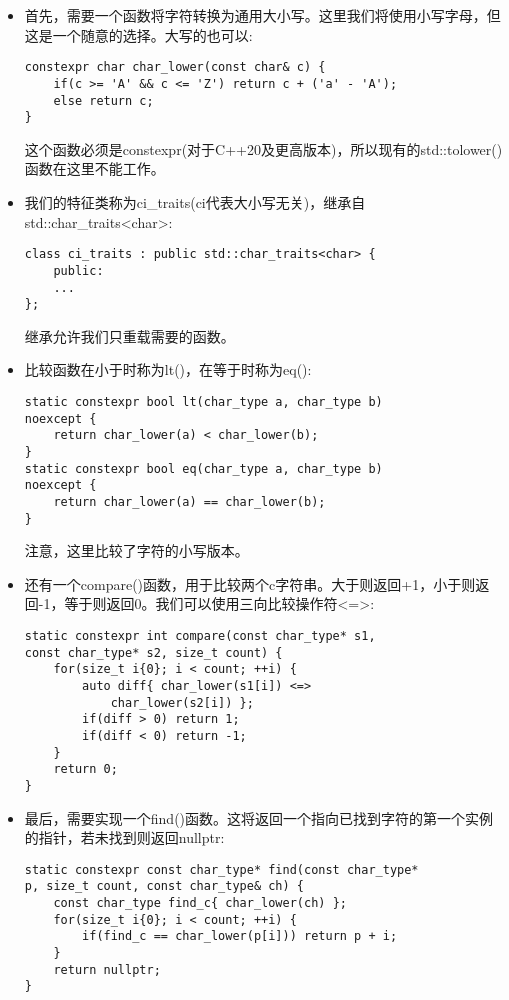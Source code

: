 \begin{itemize}
\item 
首先，需要一个函数将字符转换为通用大小写。这里我们将使用小写字母，但这是一个随意的选择。大写的也可以:

\begin{lstlisting}[style=styleCXX]
constexpr char char_lower(const char& c) {
	if(c >= 'A' && c <= 'Z') return c + ('a' - 'A');
	else return c;
}
\end{lstlisting}

这个函数必须是constexpr(对于C++20及更高版本)，所以现有的std::tolower()函数在这里不能工作。

\item 
我们的特征类称为ci\_traits(ci代表大小写无关)，继承自std::char\_traits<char>:

\begin{lstlisting}[style=styleCXX]
class ci_traits : public std::char_traits<char> {
	public:
	...
};
\end{lstlisting}

继承允许我们只重载需要的函数。

\item 
比较函数在小于时称为lt()，在等于时称为eq():

\begin{lstlisting}[style=styleCXX]
static constexpr bool lt(char_type a, char_type b)
noexcept {
	return char_lower(a) < char_lower(b);
}
static constexpr bool eq(char_type a, char_type b)
noexcept {
	return char_lower(a) == char_lower(b);
}
\end{lstlisting}

注意，这里比较了字符的小写版本。

\item 
还有一个compare()函数，用于比较两个c字符串。大于则返回+1，小于则返回-1，等于则返回0。我们可以使用三向比较操作符<=>:

\begin{lstlisting}[style=styleCXX]
static constexpr int compare(const char_type* s1,
const char_type* s2, size_t count) {
	for(size_t i{0}; i < count; ++i) {
		auto diff{ char_lower(s1[i]) <=>
			char_lower(s2[i]) };
		if(diff > 0) return 1;
		if(diff < 0) return -1;
	}
	return 0;
}
\end{lstlisting}

\item 
最后，需要实现一个find()函数。这将返回一个指向已找到字符的第一个实例的指针，若未找到则返回nullptr:

\begin{lstlisting}[style=styleCXX]
static constexpr const char_type* find(const char_type*
p, size_t count, const char_type& ch) {
	const char_type find_c{ char_lower(ch) };
	for(size_t i{0}; i < count; ++i) {
		if(find_c == char_lower(p[i])) return p + i;
	}
	return nullptr;
}
\end{lstlisting}


\end{itemize}
